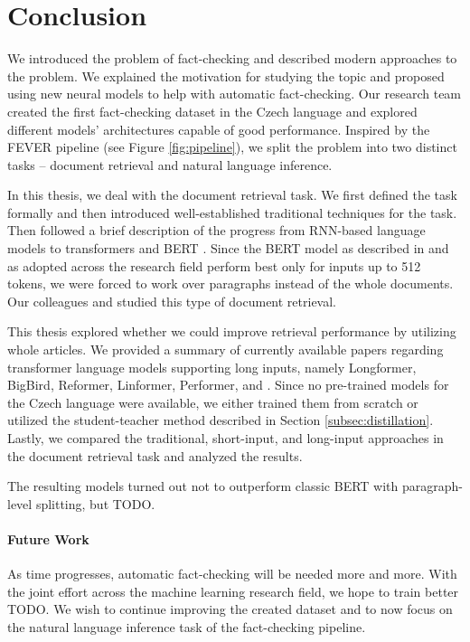 \chapter*{Conclusion}

We introduced the problem of fact-checking and described modern approaches to the problem.
We explained the motivation for studying the topic and proposed using new neural models to help with automatic fact-checking.
Our research team created the first fact-checking dataset in the Czech language \citep{ullrich} and explored different models' architectures capable of good performance.
Inspired by the FEVER pipeline \citep{fever} (see Figure \ref{fig:pipeline}), we split the problem into two distinct tasks -- document retrieval and natural language inference.

In this thesis, we deal with the document retrieval task.
We first defined the task formally and then introduced well-established traditional techniques for the task.
Then followed a brief description of the progress from RNN-based language models to transformers \citep{attention-is-all-you-need} and BERT \citep{bert}.
Since the BERT model as described in \citep{bert} and as adopted across the research field perform best only for inputs up to 512 tokens, we were forced to work over paragraphs instead of the whole documents. 
Our colleagues \citep{rypar} and \citep{dedkova} studied this type of document retrieval.

This thesis explored whether we could improve retrieval performance by utilizing whole articles. 
We provided a summary of currently available papers regarding transformer language models supporting long inputs, namely Longformer, BigBird, Reformer, Linformer, Performer, and \nystr{}.
Since no pre-trained models for the Czech language were available, we either trained them from scratch or utilized the student-teacher method \citep{student-teacher} described in Section \ref{subsec:distillation}.
Lastly, we compared the traditional, short-input, and long-input approaches in the document retrieval task and analyzed the results.

The resulting models turned out not to outperform classic BERT with paragraph-level splitting, but TODO.

\subsubsection{Future Work}

As time progresses, automatic fact-checking will be needed more and more.
With the joint effort across the machine learning research field, we hope to train better TODO.
We wish to continue improving the created \CTK{} dataset and to now focus on the natural language inference task of the fact-checking pipeline. 